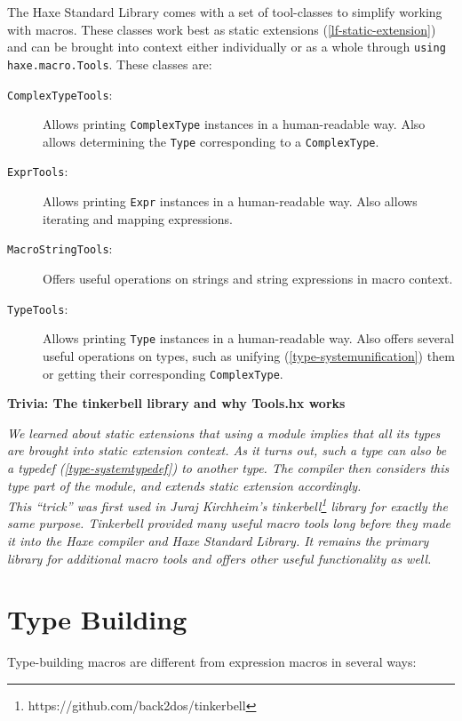 \documentclass[a4paper,oneside]{book}
\newcommand{\type}[1]{\texttt{#1}}
\newcommand{\expr}[1]{\texttt{#1}}
\newenvironment{myshaded}
  {\def\FrameCommand{\fboxsep=\topsep\colorbox{bgcolor}}%
  \MakeFramed {\advance\hsize-\width \FrameRestore}}%
 {\endMakeFramed}
\newcommand{\trivia}[2]
	{\begin{myshaded}\noindent\textbf{Trivia: #1}\par\nobreak\noindent\ignorespaces\textit{#2}\end{myshaded}}
\newcommand{\tref}[2]{#1 (\ref{#2})}
\begin{document}
The Haxe Standard Library comes with a set of tool-classes to simplify working with macros. These classes work best as \tref{static extensions}{lf-static-extension} and can be brought into context either individually or as a whole through \expr{using haxe.macro.Tools}. These classes are:

\begin{description}
	\item[\type{ComplexTypeTools}:] Allows printing \type{ComplexType} instances in a human-readable way. Also allows determining the \type{Type} corresponding to a \type{ComplexType}.
	\item[\type{ExprTools}:] Allows printing \type{Expr} instances in a human-readable way. Also allows iterating and mapping expressions.
	\item[\type{MacroStringTools}:] Offers useful operations on strings and string expressions in macro context.
	\item[\type{TypeTools}:] Allows printing \type{Type} instances in a human-readable way. Also offers several useful operations on types, such as \tref{unifying}{type-systemunification} them or getting their corresponding \type{ComplexType}.
\end{description}

\trivia{The tinkerbell library and why Tools.hx works}{We learned about static extensions that using a \emph{module} implies that all its types are brought into static extension context. As it turns out, such a type can also be a \tref{typedef}{type-systemtypedef} to another type. The compiler then considers this type part of the module, and extends static extension accordingly.\\
This ``trick'' was first used in Juraj Kirchheim's \emph{tinkerbell}\footnote{https://github.com/back2dos/tinkerbell} library for exactly the same purpose. Tinkerbell provided many useful macro tools long before they made it into the Haxe compiler and Haxe Standard Library. It remains the primary library for additional macro tools and offers other useful functionality as well.} 



\section{Type Building}
\label{macro-type-building}

Type-building macros are different from expression macros in several ways:
\end{document}
